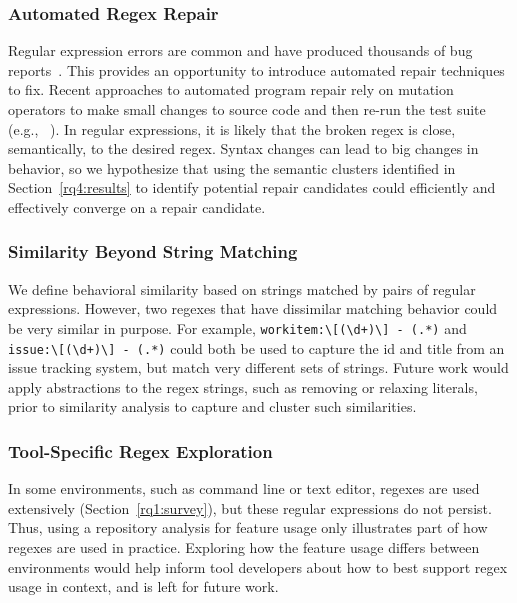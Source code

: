 
\subsubsection{Automated Regex Repair}
Regular expression errors are common and have produced thousands of bug reports~\cite{Spishak:2012:TSR:2318202.2318207}. This provides an opportunity to introduce automated repair techniques to fix.
Recent approaches to automated program repair rely on mutation operators to make small changes to source code and then re-run the test suite (e.g., ~\cite{cacm10, genprog-tse-journal}). In regular expressions, it is likely that the broken regex is close, semantically, to the desired regex. Syntax changes can lead to big changes in behavior, so we hypothesize that using the semantic clusters identified in Section~\ref{rq4:results} to identify potential repair candidates could efficiently and effectively converge on a repair candidate.

\subsubsection{Similarity Beyond String Matching}
We define behavioral similarity based on strings matched by pairs of regular expressions. However, two regexes that have dissimilar matching behavior could be very similar in purpose. For example, \verb!workitem:\[(\d+)\] - (.*)! and \verb!issue:\[(\d+)\] - (.*)! could both be used to  capture the id and title from an issue tracking system, but match very different sets of strings. Future work would apply abstractions to the regex strings, such as removing or relaxing literals, prior to similarity analysis to capture and cluster such similarities.

\subsubsection{Tool-Specific Regex Exploration}
In some environments, such as command line or text editor, regexes are used extensively (Section~\ref{rq1:survey}), but these regular expressions do not persist. Thus, using a repository analysis for feature usage only illustrates part of how regexes are used in practice. Exploring how the feature usage differs between environments would help inform tool developers about how to best support regex usage in context, and is left for future work.


